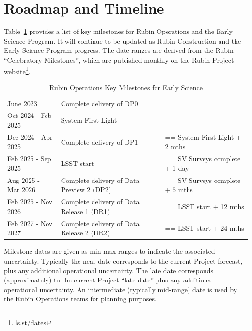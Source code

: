 \section{Roadmap and Timeline} \label{sec:timeline}

Table~\ref{tab:milestones} provides a list of key milestones for Rubin Operations and the Early Science Program.
It will continue to be updated as Rubin Construction and the Early Science Program progress. 
The date ranges are derived from the Rubin ``Celebratory Milestones'', which are  published monthly on the Rubin Project website\footnote{\url{ls.st/dates}}. 

\begin{table}[ht]
\centering
\fontsize{10}{12}\selectfont 
\setlength{\tabcolsep}{8pt} %
\renewcommand{\arraystretch}{1.4} %
\begin{tabular}{|l|ll|}
\hline
\rowcolor{gray!30} %
 \multicolumn{3}{|l|}{\textbf{Rubin Observatory Key Milestones for Early Science}} \\\hline
June 2023 & Complete delivery of DP0 &   \\
Oct 2024 - Feb 2025 & System First Light &   \\
Dec 2024 - Apr 2025 & Complete delivery of DP1 & == System First Light  +  2 mths  \\
Feb 2025 - Sep 2025 & LSST start & == SV Surveys complete  + 1 day  \\
Aug 2025 - Mar 2026 & Complete delivery of Data Preview 2 (DP2)  & == SV Surveys complete  + 6 mths  \\
Feb 2026 - Nov 2026 & Complete delivery of Data Release 1 (DR1) & == LSST  start + 12 mths \\
Feb 2027 - Nov 2027 & Complete delivery of Data Release 2 (DR2) &== LSST  start + 24 mths \\
\hline
\end{tabular}
\caption{Rubin Operations Key Milestones for Early Science}
\label{tab:milestones}
\end{table}

Milestone dates are given as min-max ranges to indicate the associated uncertainty. 
Typically the near date corresponds to the current Project forecast, plus any additional operational uncertainty.
The late date corresponds (approximately) to the current Project ``late date'' plus any additional operational uncertainty.
An intermediate (typically mid-range) date is used by the Rubin Operations teams for planning purposes. 

